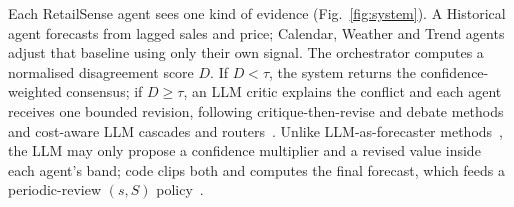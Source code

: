 \documentclass[conference]{IEEEtran}
\begin{document}
Each RetailSense agent sees one kind of evidence (Fig.~\ref{fig:system}). A Historical agent
forecasts from lagged sales and price; Calendar, Weather and Trend agents adjust that baseline using
only their own signal. The orchestrator computes a normalised disagreement score $D$. If $D<\tau$,
the system returns the confidence-weighted consensus; if $D\ge\tau$, an LLM critic explains the
conflict and each agent receives one bounded revision, following critique-then-revise and debate
methods~\cite{du2024,madaan2023} and cost-aware LLM cascades and routers~\cite{chen2023,ong2025}.
Unlike LLM-as-forecaster methods~\cite{gruver2023,jin2024}, the LLM may only propose a confidence
multiplier and a revised value inside each agent's band; code clips both and computes the final
forecast, which feeds a periodic-review $(s,S)$ policy~\cite{silver2017}.
\end{document}
